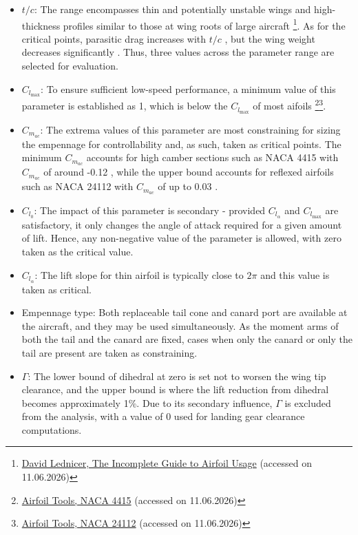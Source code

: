 \begin{itemize}
    \item $t/c$: The range encompasses thin and potentially unstable wings and high-thickness profiles similar to those at wing roots of large aircraft \footnote{\label{foot:reference_tc_values}\href{https://m-selig.ae.illinois.edu/ads/aircraft.html}{David Lednicer, The Incomplete Guide to Airfoil Usage} (accessed on 11.06.2026)}. As for the critical points, parasitic drag increases with $t/c$ \cite[p.283]{raymer1992aircraft}, but the wing weight decreases significantly \cite[p.401-405]{raymer1992aircraft}. Thus, three values across the parameter range are selected for evaluation.
    \item $C_{l_\text{max}}$: To ensure sufficient low-speed performance, a minimum value of this parameter is established as 1, which is below the $C_{l_\text{max}}$ of most aifoils \footnote{\label{foot:NACA_4415}\href{http://airfoiltools.com/airfoil/details?airfoil=naca4415-il}{Airfoil Tools, NACA 4415} (accessed on 11.06.2026)}\footnote{\label{foot:NACA_24112}\href{http://airfoiltools.com/airfoil/details?airfoil=naca24112-jf}{Airfoil Tools, NACA 24112} (accessed on 11.06.2026)}.
    \item $C_{m_{ac}}$: The extrema values of this parameter are most constraining for sizing the empennage for controllability and, as such, taken as critical points. The minimum $C_{m_{ac}}$ accounts for high camber sections such as NACA 4415 with $C_{m_{ac}}$ of around -0.12 , while the upper bound accounts for reflexed airfoils such as NACA 24112  with $C_{m_{ac}}$ of up to 0.03 .
    \item $C_{l_0}$: The impact of this parameter is secondary - provided $C_{l_\alpha}$ and $C_{l_{\mathrm{max}}}$ are satisfactory, it only changes the angle of attack required for a given amount of lift. Hence, any non-negative value of the parameter is allowed, with zero taken as the critical value.
    \item $C_{l_\alpha}$: The lift slope for thin airfoil is typically close to $2\pi$ and this value is taken as critical.
    \item Empennage type: Both replaceable tail cone and canard port are available at the aircraft, and they may be used simultaneously. As the moment arms of both the tail and the canard are fixed, cases when only the canard or only the tail are present are taken as constraining.
    \item $\Gamma$: The lower bound of dihedral at zero is set not to worsen the wing tip clearance, and the upper bound is where the lift reduction from dihedral becomes approximately 1\%. Due to its secondary influence, $\Gamma$ is excluded from the analysis, with a value of 0 used for landing gear clearance computations.
\end{itemize}

